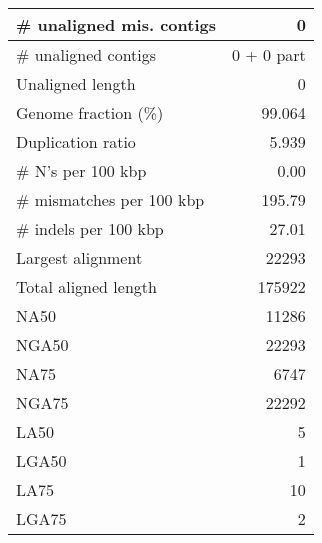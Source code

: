 \documentclass[12pt,a4paper]{article}
\begin{document}
\begin{table}[ht]
\begin{center}
\begin{tabular}{|l*{1}{|r}|}
\# unaligned mis. contigs & 0 \\ \hline
\# unaligned contigs & 0 + 0 part \\ \hline
Unaligned length & 0 \\ \hline
Genome fraction (\%) & 99.064 \\ \hline
Duplication ratio & 5.939 \\ \hline
\# N's per 100 kbp & 0.00 \\ \hline
\# mismatches per 100 kbp & 195.79 \\ \hline
\# indels per 100 kbp & 27.01 \\ \hline
Largest alignment & 22293 \\ \hline
Total aligned length & 175922 \\ \hline
NA50 & 11286 \\ \hline
NGA50 & 22293 \\ \hline
NA75 & 6747 \\ \hline
NGA75 & 22292 \\ \hline
LA50 & 5 \\ \hline
LGA50 & 1 \\ \hline
LA75 & 10 \\ \hline
LGA75 & 2 \\ \hline
\end{tabular}
\end{center}
\end{table}
\end{document}
